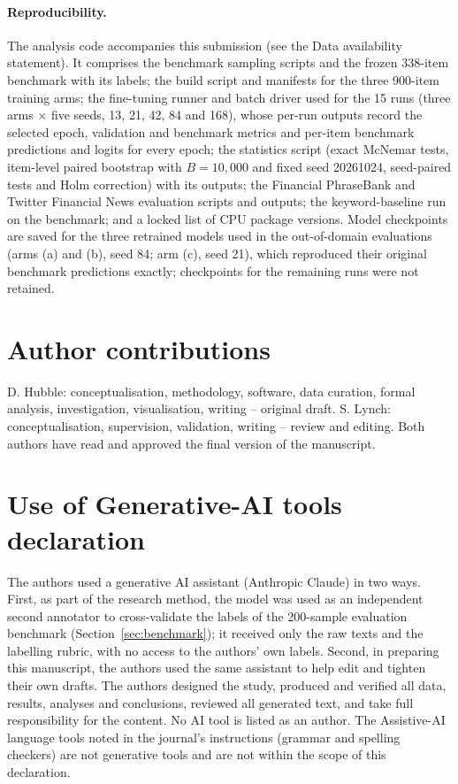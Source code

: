 \documentclass{aims}
\numberwithin{equation}{section}
\begin{document}
\paragraph{Reproducibility.}\label{sec:reprod}
The analysis code accompanies this submission (see the Data availability
statement). It comprises the benchmark sampling scripts and the frozen 338-item
benchmark with its labels; the build script and manifests for the three 900-item
training arms; the fine-tuning runner and batch driver used for the 15 runs (three
arms $\times$ five seeds, 13, 21, 42, 84 and 168), whose per-run outputs record the
selected epoch, validation and benchmark metrics and per-item benchmark predictions
and logits for every epoch; the statistics script (exact McNemar tests, item-level
paired bootstrap with $B = 10{,}000$ and fixed seed 20261024, seed-paired tests and
Holm correction) with its outputs; the Financial PhraseBank and Twitter Financial
News evaluation scripts and outputs; the keyword-baseline run on the benchmark; and a
locked list of CPU package versions. Model checkpoints are saved for the three
retrained models used in the out-of-domain evaluations (arms (a) and (b), seed 84;
arm (c), seed 21), which reproduced their original benchmark predictions exactly;
checkpoints for the remaining runs were not retained.

\section*{Author contributions}
D. Hubble: conceptualisation, methodology, software, data curation, formal analysis,
investigation, visualisation, writing -- original draft. S. Lynch: conceptualisation,
supervision, validation, writing -- review and editing. Both authors have read and
approved the final version of the manuscript.

\section*{Use of Generative-AI tools declaration}
The authors used a generative AI assistant (Anthropic Claude) in two ways. First,
as part of the research method, the model was used as an independent second
annotator to cross-validate the labels of the 200-sample evaluation benchmark
(Section~\ref{sec:benchmark}); it received only the raw texts and the labelling
rubric, with no access to the authors' own labels. Second, in preparing this
manuscript, the authors used the same assistant to help edit and tighten their own
drafts. The authors designed the study, produced and verified all data, results,
analyses and conclusions, reviewed all generated text, and take full
responsibility for the content. No AI tool is listed as an author. The Assistive-AI
language tools noted in the journal's instructions (grammar and spelling checkers)
are not generative tools and are not within the scope of this declaration.
\end{document}
